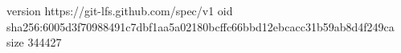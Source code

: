 version https://git-lfs.github.com/spec/v1
oid sha256:6005d3f70988491c7dbf1aa5a02180bcffc66bbd12ebcacc31b59ab8d4f249ca
size 344427
